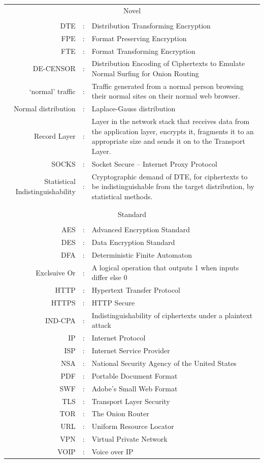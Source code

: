 \documentclass[ %
                    author={Samuel Russell},
                supervisor={Prof. Bogdan Warinschi},
                    degree={MEng},
                     title={Innocuous Ciphertexts},
                  subtitle={The DE-CENSOR Scheme},
                      type={Research},
                      year={2018} ]{dissertation}
\begin{document}
\begin{tabularx}{\textwidth}{ r c X }

\multicolumn{3}{c}{Novel}\\
&&\\
DTE					&:		& Distribution Transforming Encryption\\
FPE					&:		& Format Preserving Encryption\\
FTE					&:		& Format Transforming Encryption\\
DE-CENSOR			&:		& Distribution Encoding of Ciphertexts to Emulate Normal Surfing for Onion Routing\\
`normal' traffic		&:		& Traffic generated from a normal person browsing their normal sites on their normal web browser.\\
Normal distribution &:		& Laplace-Gauss distribution\\
Record Layer		&:		& Layer in the network stack that receives data from the application layer, encrypts it, fragments it to an appropriate size and sends it on to the Transport Layer.\\
SOCKS				&:		& Socket Secure -- Internet Proxy Protocol\\
Statistical Indistinguishability&:& Cryptographic demand of DTE, for ciphertexts to be indistinguishable from the target distribution, by statistical methods.\\
&&\\
&&\\
\multicolumn{3}{c}{Standard}\\
&&\\
AES                 &:		& Advanced Encryption Standard\\
DES                 &:		& Data Encryption Standard\\
DFA					&:		& Deterministic Finite Automaton\\
Exclsuive Or		&:		& A logical operation that outputs 1 when inputs differ else 0\\
HTTP				&:		& Hypertext Transfer Protocol\\
HTTPS				&:		& HTTP Secure\\
IND-CPA				&:		& Indistinguishability of ciphertexts under a plaintext attack\\
IP					&:		& Internet Protocol\\
ISP					&:		& Internet Service Provider\\
NSA					&:		& National Security Agency of the United States\\
PDF					&:		& Portable Document Format\\
SWF					&:		& Adobe's Small Web Format\\
TLS					&:		& Transport Layer Security\\
TOR					&:		& The Onion Router\\
URL					&:		& Uniform Resource Locator\\
VPN					&:		& Virtual Private Network\\
VOIP				&:		& Voice over IP\\

\end{tabularx}
\end{document}
